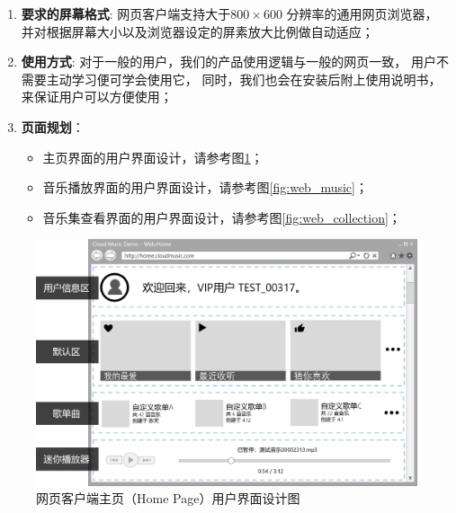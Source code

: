 \begin{enumerate}
	\item \textbf{要求的屏幕格式}:
		网页客户端支持大于$800 \times 600$ 分辨率的通用网页浏览器，
		并对根据屏幕大小以及浏览器设定的屏素放大比例做自动适应；
	\item \textbf{使用方式}:
		对于一般的用户，我们的产品使用逻辑与一般的网页一致，
			用户不需要主动学习便可学会使用它，
		同时，我们也会在安装后附上使用说明书，来保证用户可以方便使用；
	\item \textbf{页面规划}： 
	\begin{itemize}
		\item 主页界面的用户界面设计，请参考图\ref{fig:web_home}；
		\item 音乐播放界面的用户界面设计，请参考图\ref{fig:web_music}；
		\item 音乐集查看界面的用户界面设计，请参考图\ref{fig:web_collection}；
	\end{itemize}
\end{enumerate}

\begin{figure}[h!]
  \centering

  \includegraphics[width=.99\linewidth]{figures/web_home}

  \caption{  \label{fig:web_home}
  		网页客户端主页（Home Page）用户界面设计图
    }
\end{figure}

